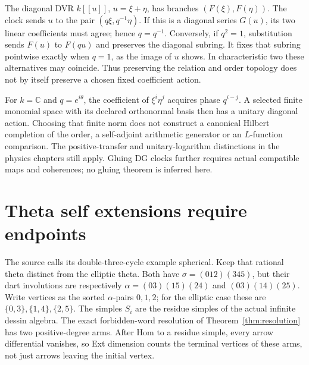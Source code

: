 The diagonal DVR $k[[u]]$, $u=\xi+\eta$, has branches $(F(\xi),F(\eta))$.
The clock sends $u$ to the pair $(q\xi,q^{-1}\eta)$. If this is a diagonal
series $G(u)$, its two linear coefficients must agree; hence $q=q^{-1}$.
Conversely, if $q^2=1$, substitution sends $F(u)$ to $F(qu)$ and preserves
the diagonal subring. It fixes that subring pointwise exactly when $q=1$,
as the image of $u$ shows. In characteristic two these alternatives may
coincide. Thus preserving the relation and order topology does not by itself
preserve a chosen fixed coefficient action.

For $k=\mathbb C$ and $q=e^{i\theta}$, the coefficient of
$\xi^i\eta^j$ acquires phase $q^{i-j}$. A selected finite monomial space
with its declared orthonormal basis then has a unitary diagonal action.
Choosing that finite norm does not construct a canonical Hilbert completion
of the order, a self-adjoint arithmetic generator or an $L$-function
comparison. The positive-transfer and unitary-logarithm distinctions in
the physics chapters still apply. Gluing DG clocks further requires actual
compatible maps and coherences; no gluing theorem is inferred here.

\section{Theta self extensions require endpoints}
The source calls its double-three-cycle example spherical. Keep that
rational theta distinct from the elliptic theta. Both have
$\sigma=(012)(345)$, but their dart involutions are respectively
$\alpha=(03)(15)(24)$ and $(03)(14)(25)$.
Write vertices as the sorted $\alpha$-pairs $0,1,2$; for the elliptic
case these are $\{0,3\},\{1,4\},\{2,5\}$.
The simples $S_i$ are the residue simples of the actual infinite dessin
algebra. The exact forbidden-word resolution of Theorem~\ref{thm:resolution}
has two positive-degree arms. After Hom to a residue simple, every
arrow differential vanishes, so Ext dimension counts the terminal vertices
of these arms, not just arrows leaving the initial vertex.

